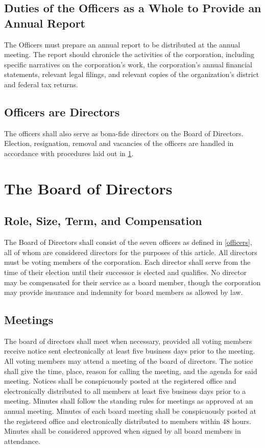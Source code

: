 \documentclass[10pt,letterpaper,titlepage]{article}
\begin{document}
\subsection{Duties of the Officers as a Whole to Provide an Annual Report}

The Officers must prepare an annual report to be distributed at the annual
meeting.
The report should chronicle the activities of the corporation, including
specific narratives on the corporation's work, the corporation's annual
financial statements, relevant legal filings, and relevant copies of the
organization's district and federal tax returns.

\subsection{Officers are Directors}

The officers shall also serve as bona-fide directors on the Board of Directors.
Election, resignation, removal and vacancies of the officers are handled in
accordance with procedures laid out in \ref{boardofdirect}.

\section{The Board of Directors}
\label{boardofdirect}

\subsection{Role, Size, Term, and Compensation}

The Board of Directors shall consist of the seven officers as defined in
\ref{officers}, all of whom are considered directors for the purposes of this
article.
All directors must be voting members of the corporation.
Each director shall serve from the time of their election until their successor
is elected and qualifies.
No director may be compensated for their service as a board member, though the
corporation may provide insurance and indemnity for board members as allowed by
law.

\subsection{Meetings}

The board of directors shall meet when necessary, provided all voting members
receive notice sent electronically at least five business days prior to the
meeting.
All voting members may attend a meeting of the board of directors.
The notice shall give the time, place, reason for calling the meeting, and the
agenda for said meeting.
Notices shall be conspicuously posted at the registered office and
electronically distributed to all members at least five business days prior to
a meeting.
Minutes shall follow the standing rules for meetings as approved at an annual
meeting.
Minutes of each board meeting shall be conspicuously posted at the registered
office and electronically distributed to members within 48 hours.
Minutes shall be considered approved when signed by all board members in
attendance.
\end{document}
